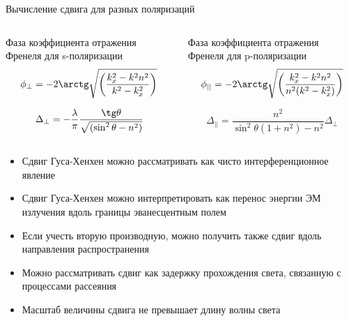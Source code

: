 \documentclass[9pt, compress, xcolor=table]{beamer}
\begin{document}
\begin{frame}{Вычисление сдвига для разных поляризаций}
\begin{columns}[c]
\column{6.3cm}
\begin{center}
Фаза коэффициента отражения Френеля для s-поляризации
\begin{equation*}
\phi_{\perp} = -2\arctg \sqrt{\left(\frac{k_x^2-k^2 n^2}{k^2-k^2_x}\right)}
\end{equation*}

\begin{equation*}
\Delta_{\perp} = -\frac{\lambda}{\pi}\frac{\tg \theta}{\sqrt{(\sin^2 \theta - n^2)}}
\end{equation*}

\end{center}
\column{6.3cm}
\begin{center}
Фаза коэффициента отражения Френеля для p-поляризации
\begin{equation*}
\phi_{||} = -2\arctg \sqrt{\left(\frac{k_x^2-k^2 n^2}{n^2(k^2-k^2_x)}\right)}
\end{equation*}

\begin{equation*}
\Delta_{||} = \frac{n^2}{\sin^2\theta(1+n^2)-n^2}\Delta_{\perp}
\end{equation*}
\end{center}
\end{columns}
\begin{itemize}
\item Сдвиг Гуса-Хенхен можно рассматривать как чисто интерференционное явление
\item Сдвиг Гуса-Хенхен можно интерпретировать как перенос энергии ЭМ излучения вдоль границы эванесцентным полем 
\item Если учесть вторую производную, можно получить также сдвиг вдоль направления распространения
\item Можно рассматривать сдвиг как задержку прохождения света, связанную с процессами рассеяния
\item Масштаб величины сдвига не превышает длину волны света
\end{itemize}
\end{frame}
\end{document}
